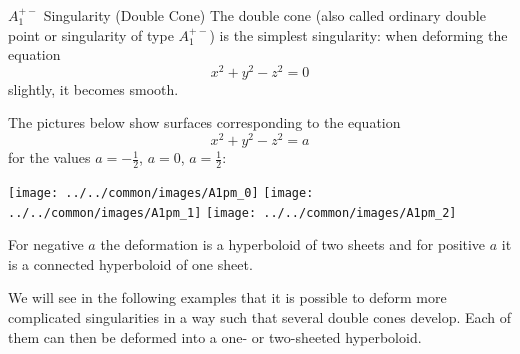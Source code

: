 \begin{surferPage}[A1+- Singularity]{$A^{+-}_1$ Singularity (Double Cone)}
	The double cone (also called ordinary double point or singularity of type $A_1^{+-}$) is the simplest singularity: when deforming the equation
	\[x^2+y^2-z^2=0\]
	slightly, it becomes smooth.

	The pictures below show surfaces corresponding to the equation
	\[x^2+y^2-z^2=a\]
	for the values $a=-\frac12$, $a=0$, $a=\frac12$:
	\begin{Centering*}%
		\texttt{[image: ../../common/images/A1pm\_0]}\quad%
		\texttt{[image: ../../common/images/A1pm\_1]}\quad%
		\texttt{[image: ../../common/images/A1pm\_2]}%
	\end{Centering*}
	For negative $a$ the deformation is a hyperboloid of two sheets and for positive $a$ it is a connected hyperboloid of one sheet.

	We will see in the following examples that it is possible to deform more
	complicated singularities in a way such that several double cones develop. Each of them can then be deformed into a one- or two-sheeted hyperboloid.
\end{surferPage}
